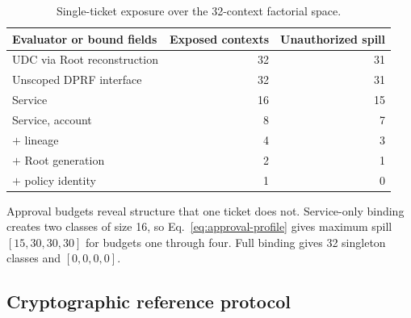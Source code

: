 \documentclass[preprint,12pt]{elsarticle}
\begin{document}
\begin{table}[t]
\centering
\caption{Single-ticket exposure over the 32-context factorial space.}
\label{tab:binding}
\small
\begin{tabular}{lrr}
\toprule
Evaluator or bound fields & Exposed contexts & Unauthorized spill \\
\midrule
UDC via Root reconstruction & 32 & 31 \\
Unscoped DPRF interface & 32 & 31 \\
Service & 16 & 15 \\
Service, account & 8 & 7 \\
$+$ lineage & 4 & 3 \\
$+$ Root generation & 2 & 1 \\
$+$ policy identity & 1 & 0 \\
\bottomrule
\end{tabular}
\end{table}

Approval budgets reveal structure that one ticket does not.  Service-only
binding creates two classes of size 16, so Eq.~\eqref{eq:approval-profile} gives
maximum spill $[15,30,30,30]$ for budgets one through four.  Full binding gives
32 singleton classes and $[0,0,0,0]$.

\subsection{Cryptographic reference protocol}
\label{sec:reference-protocol}
\end{document}
